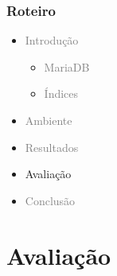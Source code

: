 \documentclass[10pt]{beamer}
\begin{document}
\begin{frame}
  \frametitle{Roteiro}

  \begin{itemize}

    \item[\color{gray}{$\bullet$}] \textcolor{gray}{Introdução}
    
    \begin{itemize}
      \item[\ ] \textcolor{gray}{MariaDB}
      \item[\ ] \textcolor{gray}{Índices}
    \end{itemize}


    \item[\color{gray}{$\bullet$}] \textcolor{gray}{Ambiente}

    \item[\color{gray}{$\bullet$}] \textcolor{gray}{Resultados}

    \item Avaliação

    \item[\color{gray}{$\bullet$}] \textcolor{gray}{Conclusão}

  \end{itemize}

\end{frame}



\section{Avaliação}
\end{document}
